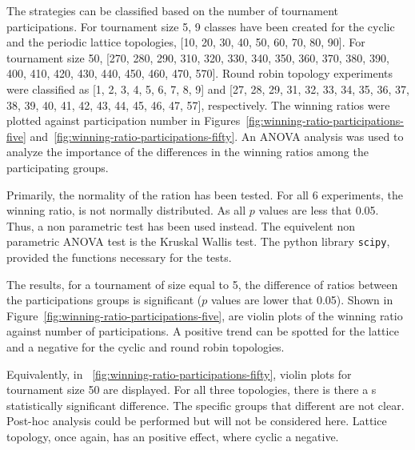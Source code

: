 The strategies can be classified based on the number of tournament
participations. For tournament size 5, 9 classes have been created for
the cyclic and the periodic lattice topologies, [10, 20, 30, 40, 50, 60, 70, 80, 90].
For tournament
size 50, [270, 280, 290, 310, 320, 330, 340, 350, 360, 370, 380, 390, 400, 410,
420, 430, 440, 450, 460, 470, 570]. Round robin topology
experiments were classified as [1, 2, 3, 4, 5, 6, 7, 8, 9] and
[27, 28, 29, 31, 32, 33, 34, 35, 36, 37, 38, 39, 40, 41, 42, 43, 44, 45, 46, 47, 57],
respectively. The winning ratios were plotted against participation number
in Figures~\ref{fig:winning-ratio-participations-five} and~\ref{fig:winning-ratio-participations-fifty}.
An ANOVA analysis was used to analyze the importance of the
differences in the winning ratios among the participating groups.

Primarily, the normality of the ration has been tested. For all 6 experiments,
the winning ratio, is not normally distributed. As all \(p\) values are
less that 0.05. Thus, a non parametric test has been used instead. The equivelent
non parametric ANOVA test is the Kruskal Wallis test. The python library
\texttt{scipy}, provided the functions necessary for the tests.

The results, for a tournament of size equal to 5, the difference
of ratios between the participations groups is significant (\(p\) values
are lower that 0.05). Shown in Figure~\ref{fig:winning-ratio-participations-five},
are violin plots of the winning ratio against number of participations.
A positive trend can be spotted for the lattice and a negative for the cyclic
and round robin topologies.

Equivalently, in ~\ref{fig:winning-ratio-participations-fifty}, violin plots for
tournament size 50 are displayed. For all three topologies, there is there  a s
statistically significant difference. The specific groups that different are not
clear. Post-hoc analysis could be performed but will not be considered here.
Lattice topology, once again, has an positive effect, where cyclic a negative.

